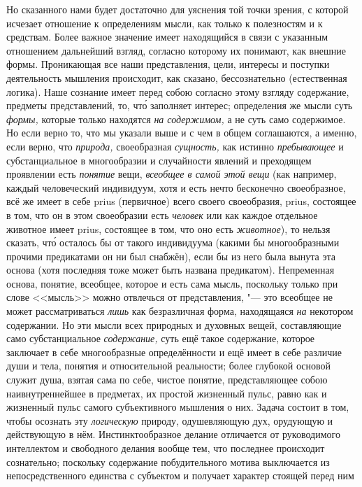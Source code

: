 Но сказанного нами будет достаточно для уяснения той точки зрения, с которой
исчезает отношение к определениям мысли, как только к полезностям и к
средствам. Более важное значение имеет находящийся в связи с указанным
отношением дальнейший взгляд, согласно которому их понимают, как внешние формы.
Проникающая все наши представления, цели, интересы и поступки деятельность
мышления происходит, как сказано, бессознательно (естественная логика). Наше
сознание имеет перед собою согласно этому взгляду содержание, предметы
представлений, то, чт\'{о} заполняет интерес; определения же мысли суть
{\em формы,} которые только находятся {\em на содержимом,} а не суть само
содержимое. Но если верно то, что мы указали выше и с чем в общем соглашаются,
а именно, если верно, что {\em природа,} своеобразная {\em сущность,} как
истинно {\em пребывающее} и субстанциальное в многообразии и случайности
явлений и преходящем проявлении есть {\em понятие} вещи, {\em всеобщее в самой
этой вещи} (как например, каждый человеческий индивидуум, хотя и есть нечто
бесконечно своеобразное, всё же имеет в себе prius (первичное) всего своего
своеобразия, prius, состоящее в том, что он в этом своеобразии есть
{\em человек} или как каждое отдельное животное имеет prius, состоящее в том,
что оно есть {\em животное}), то нельзя сказать, чт\'{о} осталось бы от такого
индивидуума (какими бы многообразными прочими предикатами он ни был снабжён),
если бы из него была вынута эта основа (хотя последняя тоже может быть названа
предикатом). Непременная основа, понятие, всеобщее, которое и есть сама мысль,
поскольку только при слове <<мысль>> можно отвлечься от представления, "--- это
всеобщее не может рассматриваться {\em лишь} как безразличная форма,
находящаяся {\em на} некотором содержании. Но эти мысли всех природных и
духовных вещей, составляющие само субстанциальное {\em содержание,} суть ещё
такое содержание, которое заключает в себе многообразные определённости и ещё
имеет в себе различие души и тела, понятия и относительной реальности; более
глубокой основой служит душа, взятая сама по себе, чистое понятие,
представляющее собою наивнутреннейшее в предметах, их простой жизненный пульс,
равно как и жизненный пульс самого субъективного мышления о них. Задача состоит
в том, чтобы осознать эту {\em логическую} природу, одушевляющую дух, орудующую
и действующую в нём. Инстинктообразное делание отличается от руководимого
интеллектом и свободного делания вообще тем, что последнее происходит
сознательно; поскольку содержание побудительного мотива выключается из
непосредственного единства с субъектом и получает характер стоящей перед ним
